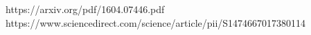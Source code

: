 \newpage
\renewcommand\refname{Список использованных источников}
\begin{thebibliography}{99}
     https://arxiv.org/pdf/1604.07446.pdf
     https://www.sciencedirect.com/science/article/pii/S1474667017380114
\end{thebibliography}
